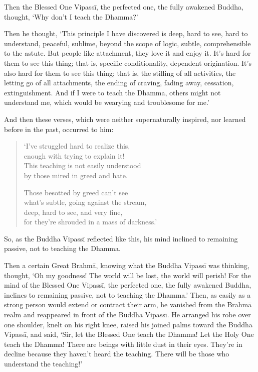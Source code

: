 \documentclass[12pt,openany]{book}%
\begin{document}
Then the Blessed One \textsanskrit{Vipassī}, the perfected one, the fully awakened Buddha, thought, ‘Why don’t I teach the Dhamma?’ 

Then he thought, ‘This principle I have discovered is deep, hard to see, hard to understand, peaceful, sublime, beyond the scope of logic, subtle, comprehensible to the astute. But people like attachment, they love it and enjoy it. It’s hard for them to see this thing; that is, specific conditionality, dependent origination. It’s also hard for them to see this thing; that is, the stilling of all activities, the letting go of all attachments, the ending of craving, fading away, cessation, extinguishment. And if I were to teach the Dhamma, others might not understand me, which would be wearying and troublesome for me.’ 

And then these verses, which were neither supernaturally inspired, nor learned before in the past, occurred to him: 

\begin{verse}%
‘I’ve struggled hard to realize this, \\
enough with trying to explain it! \\
This teaching is not easily understood \\
by those mired in greed and hate. 

Those besotted by greed can’t see \\
what’s subtle, going against the stream, \\
deep, hard to see, and very fine, \\
for they’re shrouded in a mass of darkness.’ 

%
\end{verse}

So, as the Buddha \textsanskrit{Vipassī} reflected like this, his mind inclined to remaining passive, not to teaching the Dhamma. 

Then a certain Great \textsanskrit{Brahmā}, knowing what the Buddha \textsanskrit{Vipassī} was thinking, thought, ‘Oh my goodness! The world will be lost, the world will perish! For the mind of the Blessed One \textsanskrit{Vipassī}, the perfected one, the fully awakened Buddha, inclines to remaining passive, not to teaching the Dhamma.’ Then, as easily as a strong person would extend or contract their arm, he vanished from the \textsanskrit{Brahmā} realm and reappeared in front of the Buddha \textsanskrit{Vipassī}. He arranged his robe over one shoulder, knelt on his right knee, raised his joined palms toward the Buddha \textsanskrit{Vipassī}, and said, ‘Sir, let the Blessed One teach the Dhamma! Let the Holy One teach the Dhamma! There are beings with little dust in their eyes. They’re in decline because they haven’t heard the teaching. There will be those who understand the teaching!’ 
\end{document}
